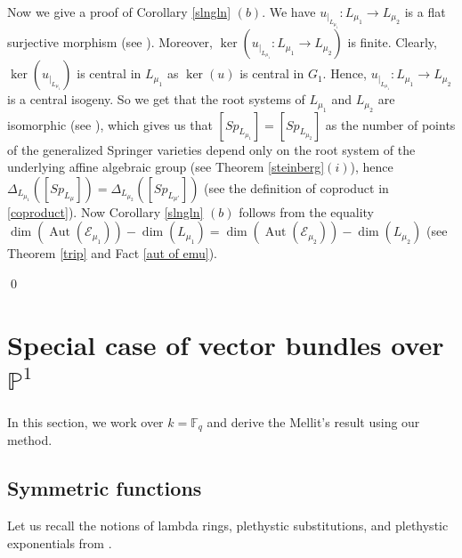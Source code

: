 \documentclass{amsart}
\newcommand{\cE}{\mathcal{E}}
\theoremstyle{plain}
\theoremstyle{definition}
\theoremstyle{remark}
\DeclareMathOperator{\aut}{Aut}
\begin{document}
Now we give a proof of Corollary \ref{slngln} $(b)$. We have $u_{|_{L_{\mu_{1}}}}:L_{\mu_{1}}\rightarrow L_{\mu_{2}}$ is a flat surjective morphism (see \cite[Corollary 2.1.9]{CGP}). Moreover, $\ker(u_{|_{L_{\mu_{1}}}}:L_{\mu_{1}}\rightarrow L_{\mu_{2}})$ is finite.
Clearly, $\ker(u_{|_{L_{\mu_{1}}}})$ is central in $L_{\mu_{1}}$ as $\ker(u)$ is central in $G_{1}$. Hence, $u_{|_{L_{\mu_{1}}}}:L_{\mu_{1}}\rightarrow L_{\mu_{2}}$ is a central isogeny. So we get that the root systems of $L_{\mu_{1}}$ and $L_{\mu_{2}}$ are isomorphic (see \cite[Proposition 23.5]{Mil1}), which gives us that $[Sp_{L_{\mu_{1}}}]=[Sp_{L_{\mu_{2}}}]$ as the number of points of the generalized Springer varieties depend only on the root system of the underlying affine algebraic group (see Theorem \ref{steinberg}$(i)$), hence $\Delta_{L_{\mu_{1}}}([Sp_{L_{\mu}}])=\Delta_{L_{\mu_{2}}}([Sp_{L_{\mu'}}])$ (see the definition of coproduct in \ref{coproduct}). Now Corollary \ref{slngln} $(b)$ follows from the equality $\dim(\aut(\cE_{\mu_{1}}))-\dim(L_{\mu_{1}})=\dim(\aut(\cE_{\mu_{2}}))-\dim(L_{\mu_{2}})$ (see Theorem \ref{trip} and Fact \ref{aut of emu}).

\qed
\section{Special case of vector bundles over \texorpdfstring{$\mathbb{P}^1$}{P1}}\label{case of gln}
In this section, we work over $k=\mathbb{F}_{q}$ and derive the Mellit's result \cite[Section 5.4]{Mel} using our method. 
\subsection{Symmetric functions}Let us recall the notions of lambda rings, plethystic substitutions, and plethystic exponentials from \cite[Section 2.1, Section 2.2]{Mel}.
\end{document}
